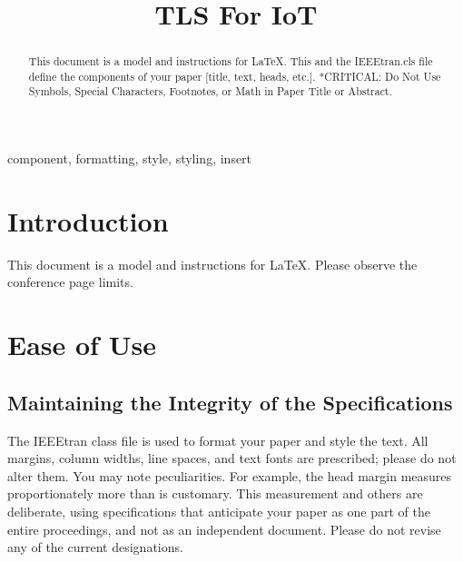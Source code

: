 \documentclass[conference]{IEEEtran}
\begin{document}
\title{TLS For IoT}

\author{
\and
{}
\and
{}
}

\maketitle

\begin{abstract}
This document is a model and instructions for \LaTeX.
This and the IEEEtran.cls file define the components of your paper [title, text, heads, etc.]. *CRITICAL: Do Not Use Symbols, Special Characters, Footnotes,
or Math in Paper Title or Abstract.
\end{abstract}

\begin{IEEEkeywords}
component, formatting, style, styling, insert
\end{IEEEkeywords}

\section{Introduction}
This document is a model and instructions for \LaTeX.
Please observe the conference page limits.

\section{Ease of Use}

\subsection{Maintaining the Integrity of the Specifications}

The IEEEtran class file is used to format your paper and style the text. All margins,
column widths, line spaces, and text fonts are prescribed; please do not
alter them. You may note peculiarities. For example, the head margin
measures proportionately more than is customary. This measurement
and others are deliberate, using specifications that anticipate your paper
as one part of the entire proceedings, and not as an independent document.
Please do not revise any of the current designations.
\end{document}

